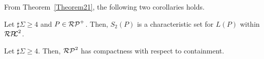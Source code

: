 From Theorem~\ref{Theorem21}, 
the following two corollaries holds.

\begin{col}
    Let $\sharp\Sigma \geq 4$ and $P \in \mathcal{RP}^{+}$.
    Then, $S_{2}(P)$ is a characteristic set for $L(P)$ within $\mathcal{RP\!\!L}^{2}$.
\end{col}

\begin{col}
    Let $\sharp\Sigma \geq 4$.
    Then, $\mathcal{RP}^{2}$ has compactness with respect to containment.
\end{col}
